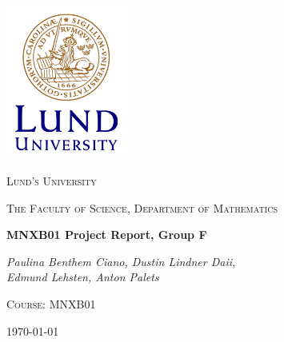 \newcommand{\uvec}[1]{\boldsymbol{\hat{\textbf{#1}}}}

\makeatletter
\patchcmd{\@maketitle}{\LARGE \@title}{\fontsize{16}{19.2}\selectfont\@title}{}{}
\makeatother

\renewcommand\Authfont{\fontsize{12}{14.4}\selectfont}
\renewcommand\Affilfont{\fontsize{9}{10.8}\itshape}
\begin{titlepage}
		\centering
		\includegraphics[width=0.3\textwidth]{logo}\par\vspace{1cm}
		{\scshape\LARGE Lund's University \par}
		{\scshape\large The Faculty of Science, 
Department of Mathematics\par}
		\vspace{0.2cm}
		{\huge\bfseries MNXB01 Project Report, Group F\par}
		\vspace{2cm}
		{\Large\itshape Paulina Benthem Ciano, Dustin Lindner Daii,\\ Edmund Lehsten, Anton Palets \par}
		{\scshape Course: MNXB01}
		\par
		\vfill
	   
		
		\vfill
		
		{\large \today\par}
	\end{titlepage}
	\newpage
	\newpage
	\title{}
\newpage